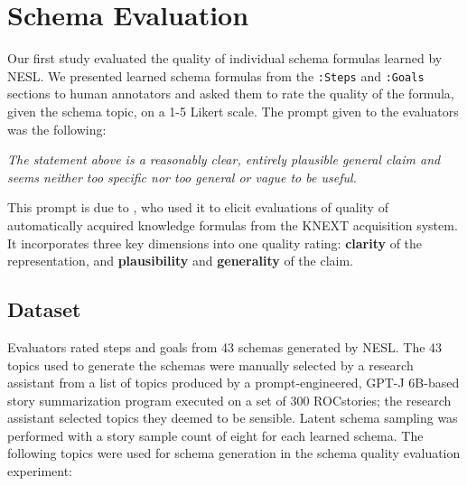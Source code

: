 \section{Schema Evaluation}
\label{sec:schema_eval}
Our first study evaluated the quality of individual schema formulas learned by NESL. We presented learned schema formulas from the \texttt{:Steps} and \texttt{:Goals} sections to human annotators and asked them to rate the quality of the formula, given the schema topic, on a 1-5 Likert scale. The prompt given to the evaluators was the following:
\begin{displayquote}
\textit{The statement above is a reasonably clear, entirely plausible general claim and seems neither too specific nor too general or vague to be useful.}
\end{displayquote}
This prompt is due to \citet{knext-eval}, who used it to elicit evaluations of quality of automatically acquired knowledge formulas from the \textsc{KNEXT} acquisition system. It incorporates three key dimensions into one quality rating: \textbf{clarity} of the representation, and \textbf{plausibility} and \textbf{generality} of the claim.

\subsection{Dataset}
Evaluators rated steps and goals from 43 schemas generated by NESL. The 43 topics used to generate the schemas were manually selected by a research assistant from a list of topics produced by a prompt-engineered, GPT-J 6B-based story summarization program executed on a set of 300 ROCstories; the research assistant selected topics they deemed to be sensible. Latent schema sampling was performed with a story sample count of eight for each learned schema. The following topics were used for schema generation in the schema quality evaluation experiment:

